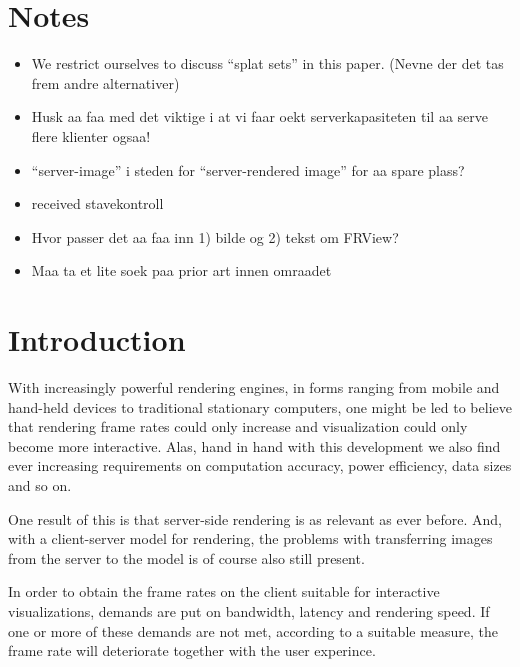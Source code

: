 \section{Notes}

\begin{itemize}

\item We restrict ourselves to discuss ``splat sets'' in this paper. (Nevne der det
tas frem andre alternativer)

\item
Husk aa faa med det viktige i at vi faar oekt serverkapasiteten til aa
serve flere klienter ogsaa!

\item
``server-image'' i steden for ``server-rendered image'' for aa spare plass?

\item received stavekontroll

\item Hvor passer det aa faa inn 1) bilde og 2) tekst om FRView?

\item Maa ta et lite soek paa prior art innen omraadet

\end{itemize}

\section{Introduction}

With increasingly powerful rendering engines, in forms ranging from mobile and
hand-held devices to traditional stationary computers, one might be led to
believe that rendering frame rates could only increase and visualization could
only become more interactive. Alas, hand in hand with this development we also
find ever increasing requirements on computation accuracy, power efficiency,
data sizes and so on.

One result of this is that server-side rendering is as relevant as ever
before. And, with a client-server model for rendering, the problems with
transferring images from the server to the model is of course also still
present.

In order to obtain the frame rates on the client suitable for interactive
visualizations, demands are put on bandwidth, latency and rendering speed. If
one or more of these demands are not met, according to a suitable measure, the
frame rate will deteriorate together with the user experince.

